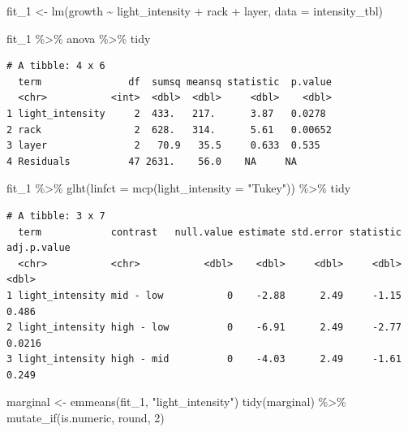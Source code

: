 \documentclass[
  letterpaper,
  DIV=11,
  oneside]{scrreport}
\newenvironment{Shaded}{\begin{snugshade}}{\end{snugshade}}
\newcommand{\AttributeTok}[1]{\textcolor[rgb]{0.40,0.45,0.13}{#1}}
\newcommand{\DecValTok}[1]{\textcolor[rgb]{0.68,0.00,0.00}{#1}}
\newcommand{\FunctionTok}[1]{\textcolor[rgb]{0.28,0.35,0.67}{#1}}
\newcommand{\NormalTok}[1]{\textcolor[rgb]{0.00,0.23,0.31}{#1}}
\newcommand{\OtherTok}[1]{\textcolor[rgb]{0.00,0.23,0.31}{#1}}
\newcommand{\SpecialCharTok}[1]{\textcolor[rgb]{0.37,0.37,0.37}{#1}}
\newcommand{\StringTok}[1]{\textcolor[rgb]{0.13,0.47,0.30}{#1}}
\begin{document}
\begin{Shaded}
\begin{Highlighting}[]
\NormalTok{fit\_1 }\OtherTok{\textless{}{-}} \FunctionTok{lm}\NormalTok{(growth }\SpecialCharTok{\textasciitilde{}}\NormalTok{ light\_intensity }\SpecialCharTok{+}\NormalTok{ rack }\SpecialCharTok{+}\NormalTok{ layer, }\AttributeTok{data =}\NormalTok{ intensity\_tbl)}

\NormalTok{fit\_1 }\SpecialCharTok{\%\textgreater{}\%}\NormalTok{ anova }\SpecialCharTok{\%\textgreater{}\%}\NormalTok{ tidy}
\end{Highlighting}
\end{Shaded}

\begin{verbatim}
# A tibble: 4 x 6
  term               df  sumsq meansq statistic  p.value
  <chr>           <int>  <dbl>  <dbl>     <dbl>    <dbl>
1 light_intensity     2  433.   217.      3.87   0.0278 
2 rack                2  628.   314.      5.61   0.00652
3 layer               2   70.9   35.5     0.633  0.535  
4 Residuals          47 2631.    56.0    NA     NA      
\end{verbatim}

\begin{Shaded}
\begin{Highlighting}[]
\NormalTok{fit\_1 }\SpecialCharTok{\%\textgreater{}\%} \FunctionTok{glht}\NormalTok{(}\AttributeTok{linfct =} \FunctionTok{mcp}\NormalTok{(}\AttributeTok{light\_intensity =} \StringTok{"Tukey"}\NormalTok{)) }\SpecialCharTok{\%\textgreater{}\%}\NormalTok{ tidy}
\end{Highlighting}
\end{Shaded}

\begin{verbatim}
# A tibble: 3 x 7
  term            contrast   null.value estimate std.error statistic adj.p.value
  <chr>           <chr>           <dbl>    <dbl>     <dbl>     <dbl>       <dbl>
1 light_intensity mid - low           0    -2.88      2.49     -1.15      0.486 
2 light_intensity high - low          0    -6.91      2.49     -2.77      0.0216
3 light_intensity high - mid          0    -4.03      2.49     -1.61      0.249 
\end{verbatim}

\begin{Shaded}
\begin{Highlighting}[]
\NormalTok{marginal }\OtherTok{\textless{}{-}} \FunctionTok{emmeans}\NormalTok{(fit\_1, }\StringTok{"light\_intensity"}\NormalTok{)}
\FunctionTok{tidy}\NormalTok{(marginal) }\SpecialCharTok{\%\textgreater{}\%} 
  \FunctionTok{mutate\_if}\NormalTok{(is.numeric, round, }\DecValTok{2}\NormalTok{)}
\end{Highlighting}
\end{Shaded}
\end{document}
